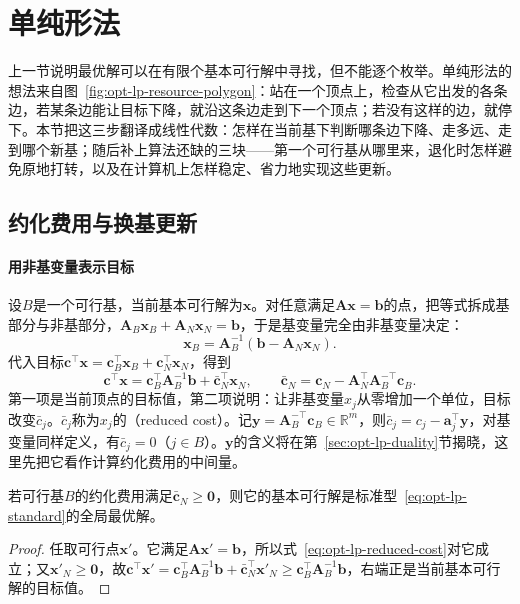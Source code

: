 \section{单纯形法}
\label{sec:opt-lp-simplex}

上一节说明最优解可以在有限个基本可行解中寻找，但不能逐个枚举。单纯形法的想法来自图~\ref{fig:opt-lp-resource-polygon}：站在一个顶点上，检查从它出发的各条边，若某条边能让目标下降，就沿这条边走到下一个顶点；若没有这样的边，就停下。本节把这三步翻译成线性代数：怎样在当前基下判断哪条边下降、走多远、走到哪个新基；随后补上算法还缺的三块——第一个可行基从哪里来，退化时怎样避免原地打转，以及在计算机上怎样稳定、省力地实现这些更新。

\subsection{约化费用与换基更新}
\label{sec:opt-lp-reduced-cost}

\paragraph{用非基变量表示目标}
设$B$是一个可行基，当前基本可行解为$\bm x$。对任意满足$\bm A\bm x=\bm b$的点，把等式拆成基部分与非基部分，$\bm A_B\bm x_B+\bm A_N\bm x_N=\bm b$，于是基变量完全由非基变量决定：
\[
  \bm x_B=\bm A_B^{-1}(\bm b-\bm A_N\bm x_N).
\]
代入目标$\bm c^\top\bm x=\bm c_B^\top\bm x_B+\bm c_N^\top\bm x_N$，得到
\begin{equation}
\label{eq:opt-lp-reduced-cost}
  \bm c^\top\bm x=\bm c_B^\top\bm A_B^{-1}\bm b+\bar{\bm c}_N^\top\bm x_N,
  \qquad
  \bar{\bm c}_N=\bm c_N-\bm A_N^\top\bm A_B^{-\top}\bm c_B.
\end{equation}
第一项是当前顶点的目标值，第二项说明：让非基变量$x_j$从零增加一个单位，目标改变$\bar c_j$。$\bar c_j$称为$x_j$的（reduced cost）。记$\bm y=\bm A_B^{-\top}\bm c_B\in\mathbb R^m$，则$\bar c_j=c_j-\bm a_j^\top\bm y$，对基变量同样定义，有$\bar c_j=0$（$j\in B$）。$\bm y$的含义将在第~\ref{sec:opt-lp-duality}节揭晓，这里先把它看作计算约化费用的中间量。

\begin{theorem}[最优性判别]
\label{thm:opt-lp-optimality-criterion}
若可行基$B$的约化费用满足$\bar{\bm c}_N\ge\bm 0$，则它的基本可行解是标准型~\eqref{eq:opt-lp-standard}的全局最优解。
\end{theorem}

\begin{proof}
任取可行点$\bm x'$。它满足$\bm A\bm x'=\bm b$，所以式~\eqref{eq:opt-lp-reduced-cost}对它成立；又$\bm x'_N\ge\bm 0$，故$\bm c^\top\bm x'=\bm c_B^\top\bm A_B^{-1}\bm b+\bar{\bm c}_N^\top\bm x'_N\ge\bm c_B^\top\bm A_B^{-1}\bm b$，右端正是当前基本可行解的目标值。
\end{proof}

